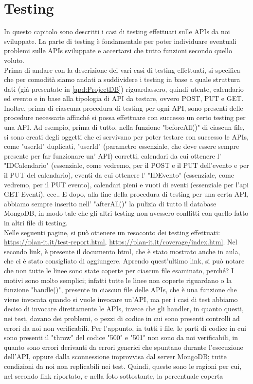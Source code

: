 \section{Testing}
\label{secD4:Testing}

In questo capitolo sono descritti i casi di testing effettuati sulle APIs da noi sviluppate. La parte di testing è fondamentale per poter individuare eventuali problemi sulle APIs sviluppate e accertarsi che tutto funzioni secondo quello voluto.\\
Prima di andare con la descrizione dei vari casi di testing effettuati, si specifica che per comodità siamo andati a suddividere i testing in base a quale struttura dati (già presentate in \ref{apd:ProjectDB}) riguardassero, quindi utente, calendario ed evento e in base alla tipologia di API da testare, ovvero POST, PUT e GET. Inoltre, prima di ciascuna procedura di testing per ogni API, sono presenti delle procedure necessarie affinché si possa effettuare con successo un certo testing per una API. Ad esempio, prima di tutto, nella funzione "beforeAll()" di ciascun file, si sono creati degli oggetti che ci servivano per poter testare con successo le APIs, come "userId" duplicati, "userId" (parametro essenziale, che deve essere sempre presente per far funzionare un' API) corretti, calendari da cui ottenere l' "IDCalendario" (essenziale, come vedremo, per il POST e il PUT dell'evento e per il PUT del calendario), eventi da cui ottenere l' "IDEvento" (essenziale, come vedremo, per il PUT evento), calendari pieni e vuoti di eventi (essenziale per l'api GET Eventi), ecc.. E dopo, alla fine della procedura di testing per una certa API, abbiamo sempre inserito nell' "afterAll()" la pulizia di tutto il database MongoDB, in modo tale che gli altri testing non avessero conflitti con quello fatto in altri file di testing. \\ Nelle seguenti pagine, si può ottenere un resoconto dei testing effettuati: \href{https://plan-it.it/test-report.html} {https://plan-it.it/test-report.html}, \href{https://plan-it.it/coverage/index.html} {https://plan-it.it/coverage/index.html}. Nel secondo link, è presente il documento html, che è stato mostrato anche in aula, che ci è stato consigliato di aggiungere. Aprendo quest'ultimo link, si può notare che non tutte le linee sono state coperte per ciascun file esaminato, perché? I motivi sono molto semplici; infatti tutte le linee non coperte riguardano o la funzione "handle()", presente in ciascun file delle APIs, che è una funzione che viene invocata quando si vuole invocare un'API, ma per i casi di test abbiamo deciso di invocare direttamente le APIs, invece che gli handler, in quanto questi, nei test, davano dei problemi, o pezzi di codice in cui sono presenti controlli ad errori da noi non verificabili. Per l'appunto, in tutti i file, le parti di codice in cui sono presenti il "throw" del codice "500" e "501" non sono da noi verificabili, in quanto sono errori derivanti da errori generici che spuntano durante l'esecuzione dell'API, oppure dalla sconnessione improvvisa dal server MongoDB; tutte condizioni da noi non replicabili nei test. Quindi, queste sono le ragioni per cui, nel secondo link riportato, e nella foto sottostante, la percentuale coperta 